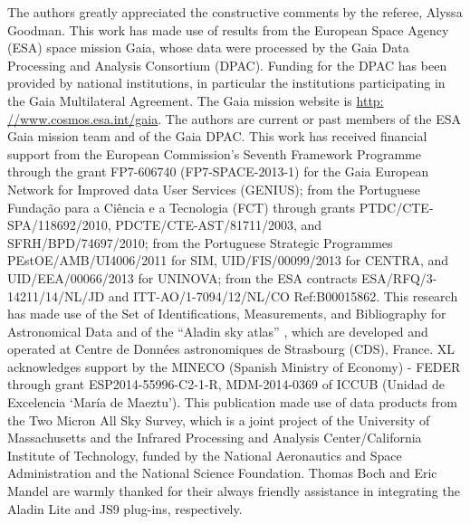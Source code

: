 \documentclass[longauth, final]{aa}
\begin{document}
\begin{acknowledgements}
The authors greatly appreciated the constructive comments by the referee, Alyssa Goodman. 
This work has made use of results from the European Space Agency (ESA) space mission Gaia, whose data were processed by the Gaia Data Processing and Analysis Consortium (DPAC). Funding for the DPAC has been provided by national institutions, in particular the institutions participating in the Gaia Multilateral Agreement. The Gaia mission website is \url{http: //www.cosmos.esa.int/gaia}. The authors are current or past members of the ESA Gaia mission team and of the Gaia DPAC. This work has received financial support from the European Commission’s Seventh Framework Programme through the grant FP7-606740 (FP7-SPACE-2013-1) for the Gaia European Network for Improved data User Services (GENIUS); from the Portuguese Funda\c c\~ao para a Ci\^encia e a Tecnologia (FCT) through grants PTDC/CTE-SPA/118692/2010, PDCTE/CTE-AST/81711/2003, and SFRH/BPD/74697/2010; from the Portuguese Strategic Programmes PEstOE/AMB/UI4006/2011 for SIM, UID/FIS/00099/2013 for CENTRA, and UID/EEA/00066/2013 for UNINOVA; from the ESA contracts ESA/RFQ/3-14211/14/NL/JD and ITT-AO/1-7094/12/NL/CO Ref:B00015862. This research has made use of the Set of Identifications, Measurements, and Bibliography for Astronomical Data \citep{Wenger2000} and of the ``Aladin sky atlas'' \citep{2000A&AS..143...33B,2014ASPC..485..277B}, which are developed and operated at Centre de Donn\'ees astronomiques de Strasbourg (CDS), France. 
XL acknowledges support by the MINECO (Spanish Ministry of Economy) - FEDER through grant ESP2014-55996-C2-1-R,  MDM-2014-0369 of ICCUB (Unidad de Excelencia `Mar\'ia de Maeztu').
This publication made use of data products from the Two Micron All Sky Survey, which is a joint project of the University of Massachusetts and the Infrared Processing and Analysis Center/California Institute of Technology, funded by the National Aeronautics and Space Administration and the National Science Foundation. Thomas Boch and Eric Mandel are warmly thanked for their always friendly assistance in integrating the Aladin Lite and JS9 plug-ins, respectively.
      
\end{acknowledgements}
\end{document}

